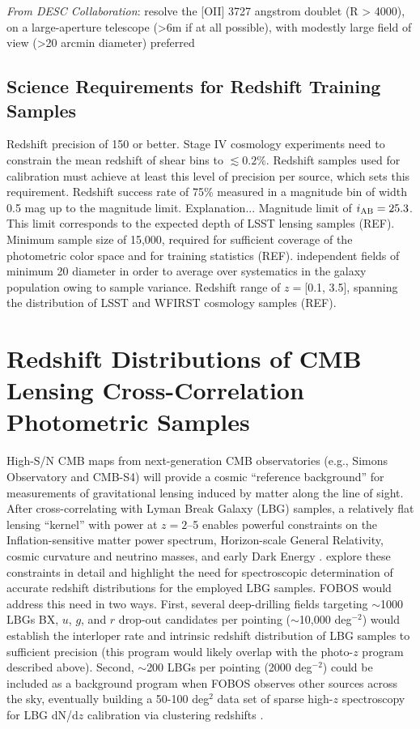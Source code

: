 \documentclass[11pt,a4paper,twoside,onecolumn,openany,final,oldfontcommands]{memoir}
\begin{document}
\emph{From DESC Collaboration}: resolve the [OII] 3727 angstrom doublet (R > 4000), on a large-aperture telescope (>6m if at all possible), with modestly large field of view (>20 arcmin diameter) preferred

\subsection{Science Requirements for Redshift Training Samples}

\begin{sciencerequirement}
\reqitem Redshift precision of 150 \kms{} or better. Stage IV cosmology experiments need to constrain the mean redshift of shear bins to $\lesssim0.2\%$. Redshift samples used for calibration must achieve at least this level of precision per source, which sets this requirement. 
%
\reqitem Redshift success rate of 75\% measured in a magnitude bin of width 0.5 mag up to the magnitude limit.  Explanation...
%
\reqitem Magnitude limit of $i_{\rm AB} = 25.3$.  This limit corresponds to the expected depth of LSST lensing samples (REF).
%
\reqitem Minimum sample size of 15,000, required for sufficient coverage of the photometric color space and for training statistics (REF).
%
 independent fields of minimum 20\arcmin{} diameter in order to average over systematics in the galaxy population owing to sample variance.
%
\reqitem Redshift range of $z = $[0.1, 3.5], spanning the distribution of LSST and WFIRST cosmology samples (REF).
%
\end{sciencerequirement}

\section{Redshift Distributions of CMB Lensing Cross-Correlation Photometric Samples}

High-S/N CMB maps from next-generation CMB observatories (e.g., Simons Observatory and CMB-S4) will provide a cosmic ``reference background'' for measurements of gravitational lensing induced by matter along the line of sight.  After cross-correlating with Lyman Break Galaxy (LBG) samples, a relatively flat lensing ``kernel'' with power at $z = 2$--5 enables powerful constraints on the Inflation-sensitive matter power spectrum, Horizon-scale General Relativity, cosmic curvature and neutrino masses, and early Dark Energy \citep{ferraro19}.  \citet{wilson19} explore these constraints in detail and highlight the need for spectroscopic determination of accurate redshift distributions for the employed LBG samples. FOBOS would address this need in two ways.  First, several deep-drilling fields targeting $\sim$1000 LBGs BX, $u$, $g$, and $r$ drop-out candidates per pointing ($\sim$10,000 deg$^{-2}$) would establish the interloper rate and intrinsic redshift distribution of LBG samples to sufficient precision (this program would likely overlap with the photo-$z$ program described above).  Second, $\sim$200 LBGs per pointing (2000 deg$^{-2}$) could be included as a background program when FOBOS observes other sources across the sky, eventually building a 50-100 deg$^2$ data set of sparse high-$z$ spectroscopy for LBG dN/d$z$ calibration via clustering redshifts \citep[see][]{wilson19}. 
\end{document}
